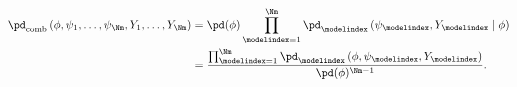 \begin{equation}
  \begin{aligned}
    \pd_{\text{comb}}\left(\phi, \psi_{1}, \ldots, \psi_{\Nm}, Y_{1}, \ldots, Y_{\Nm}\right)
    &= \pd(\phi) \prod_{\modelindex = 1}^{\Nm} \pd_{\modelindex}\left(\psi_{\modelindex}, Y_{\modelindex} \mid \phi\right) \\
    &= \frac{\prod_{\modelindex = 1}^{\Nm} \pd_{\modelindex}\left(\phi, \psi_{\modelindex}, Y_{\modelindex}\right)}{\pd(\phi)^{\Nm - 1}}.
  \end{aligned}
  \label{eqn:markov-combination}
\end{equation}